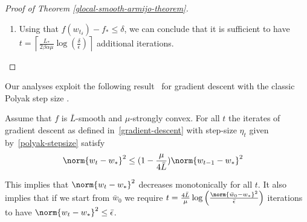 \documentclass[10pt]{article} %
\newif\ifextended
\begin{document}
\begin{proof}[Proof of Theorem \ref{glocal-smooth-armijo-theorem}]
\begin{enumerate}
    \item Using that $f(w_{t_\delta}) - f_* \leq \delta$, we can conclude that it is sufficient to have $t = \left\lceil \frac{L_{*}}{2\beta\alpha\mu}\log\left(\frac{\delta}{\epsilon}\right) \right\rceil$ additional iterations.
    \end{enumerate}
\end{proof}

\ifextended

\section{Polyak Step Size Convergence Results}\label{polyak-proofs}
\label{app:polyak}
In this section we give the proof of Theorem \ref{polyak-theorem}.
\ifextended
We also give an example where the Polyak step size leads to an increase in the function value,
and also analyze the Polyak step size under glocal smoothness of the iterates (Theorem~\ref{polyak-theorem-iterates}). 
\fi
Our analyses exploit the following result~\cite[Lemma~1, Lemma~2]{hazan2019revisiting} for gradient descent with the classic Polyak step size \cite{polyak1987introduction}.

\begin{lemma}
\label{lem:GD-Polyak}
Assume that $f$ is $\bar{L}$-smooth and $\mu$-strongly convex. For all $t$ the iterates of gradient descent as defined in~\eqref{gradient-descent} with step-size $\eta_t$ given by~\eqref{polyak-stepsize} satisfy
    \begin{align*}
        \norm{w_{t} - w_*}^2 
        &\leq (1 - \frac{\mu}{4\bar{L}})\norm{w_{t-1} - w_*}^2
    \end{align*} 
\end{lemma}
This implies that $\norm{w_t - w_*}^2
$ decreases monotonically for all $t$. It also implies that if we start from $\bar{w}_0$ we require $t = \frac{4\bar{L}}{\mu}\log\left(\frac{\norm{\bar{w}_0 - w_*}^2}{\bar{\epsilon}}\right)$ iterations to have $\norm{w_t-w_*}^2 \leq \bar{\epsilon}$.

\ifextended
\end{document}
